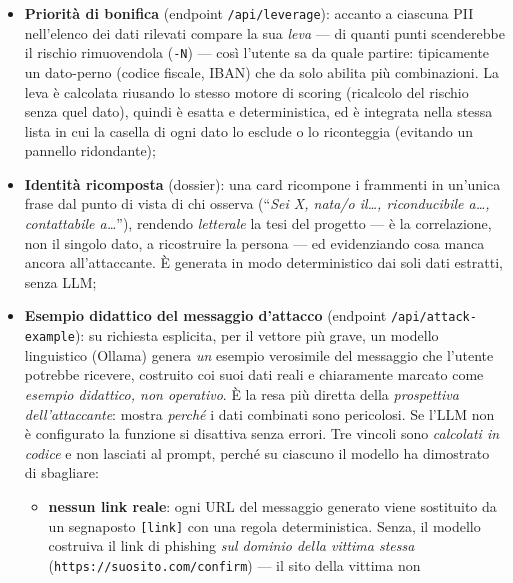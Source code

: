 \documentclass[11pt,a4paper]{article}
\begin{document}
\begin{itemize}[nosep]
        deterministico lato UI; il comune di nascita tramite lookup sulla tabella dei
        codici catastali dei comuni), gestendo anche il caso dell'\emph{omocodia};
  \item \textbf{Priorità di bonifica} (endpoint \texttt{/api/leverage}): accanto a ciascuna
        PII nell'elenco dei dati rilevati compare la sua \emph{leva} --- di quanti punti
        scenderebbe il rischio rimuovendola (\texttt{-N}) --- così l'utente sa da quale
        partire: tipicamente un dato-perno (codice fiscale, IBAN) che da solo abilita più
        combinazioni. La leva è calcolata riusando lo stesso motore di scoring (ricalcolo
        del rischio senza quel dato), quindi è esatta e deterministica, ed è integrata nella
        stessa lista in cui la casella di ogni dato lo esclude o lo riconteggia (evitando un
        pannello ridondante);
  \item \textbf{Identità ricomposta} (dossier): una card ricompone i frammenti in un'unica
        frase dal punto di vista di chi osserva (``\emph{Sei X, nata/o il\ldots, riconducibile
        a\ldots, contattabile a\ldots}''), rendendo \emph{letterale} la tesi del progetto ---
        è la correlazione, non il singolo dato, a ricostruire la persona --- ed evidenziando
        cosa manca ancora all'attaccante. È generata in modo deterministico dai soli dati
        estratti, senza LLM;
  \item \textbf{Esempio didattico del messaggio d'attacco} (endpoint
        \texttt{/api/attack-example}): su richiesta esplicita, per il vettore più grave, un
        modello linguistico (Ollama) genera \emph{un} esempio verosimile del messaggio che
        l'utente potrebbe ricevere, costruito coi suoi dati reali e chiaramente marcato come
        \emph{esempio didattico, non operativo}. È la resa più diretta
        della \emph{prospettiva dell'attaccante}: mostra \emph{perché} i dati combinati sono
        pericolosi. Se l'LLM non è configurato la funzione si disattiva senza errori.
        Tre vincoli sono \emph{calcolati in codice} e non lasciati al prompt, perché su
        ciascuno il modello ha dimostrato di sbagliare:
        \begin{itemize}[nosep]
          \item \textbf{nessun link reale}: ogni URL del messaggio generato viene sostituito
                da un segnaposto \texttt{[link]} con una regola deterministica. Senza,
                il modello costruiva il link di phishing \emph{sul dominio della vittima
                stessa} (\texttt{https://suosito.com/confirm}) --- il sito della vittima non

\end{itemize}
\end{itemize}
\end{document}
